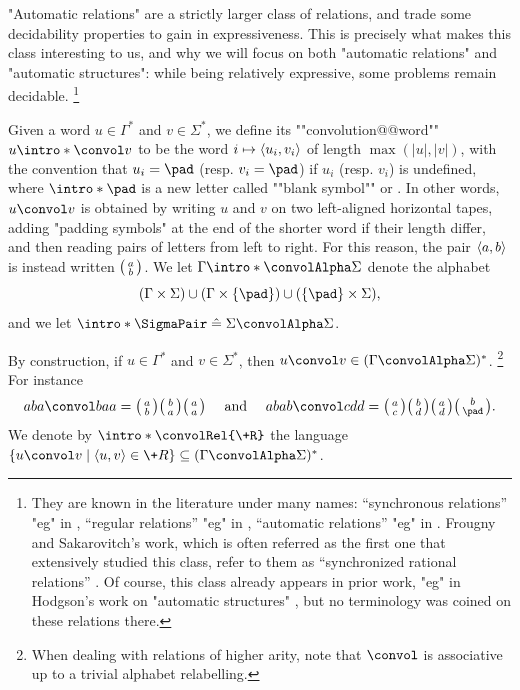 "Automatic relations" are a strictly larger class of relations,
and trade some decidability properties to gain in expressiveness.
This is precisely what makes this class interesting to us, and why we will focus
on both "automatic relations" and "automatic structures": while being relatively
expressive, some problems remain decidable.%
\footnote{They are known in the literature under many names:
``synchronous relations''
	"eg" in \cite[Definition~2.3]{CartonChoffrutGrigorieff2006DecisionProblems},
``regular relations''
	"eg" in \cite[Definition~2.2]{KhoussainovNerode1995AutomaticPresentations},
``automatic relations''
	"eg" in \cite[\S~2.1]{LodingSpinrath2019DecisionProblems}.
Frougny and Sakarovitch's work, which is often referred as the first one
that extensively studied this class, refer to them as ``synchronized rational relations''
\cite[\S~4]{FrougnySakarovitch1993SynchronizedRationalRelations}.
Of course, this class already appears in prior work, "eg" in Hodgson's work on
"automatic structures" \cite{Hodgson1983Decidabilite}, but no terminology was coined on these relations there.}

Given a word $u \in \Gamma^*$ and $v\in \Sigma^*$, we define
its \AP""convolution@@word"" $u \intro*\convol v$ to be the word
$i \mapsto \langle u_i, v_i\rangle$ of length $\max{(|u|,|v|)}$,
with the convention that $u_i = \pad$ (resp. $v_i = \pad$)
if $u_i$ (resp. $v_i$) is undefined, where $\intro*\pad$ is a new letter called
""blank symbol"" or . In other words,
$u \convol v$ is obtained by writing $u$ and $v$ on two left-aligned horizontal tapes,
adding "padding symbols" at the end of the shorter word if their length differ,
and then reading pairs of letters from left to right.
For this reason, the pair $\langle a,b\rangle$ is instead written $\pair{a}{b}$.
We let \AP$\Gamma \intro*\convolAlpha \Sigma$ denote the alphabet
\[(\Gamma \times \Sigma) \cup (\Gamma \times \{\pad\}) \cup (\{\pad\} \times \Sigma),\]
and we let $\intro*\SigmaPair \defeq \Sigma \convolAlpha \Sigma$.

By construction, if $u \in \Gamma^*$ and $v\in \Sigma^*$, then $u\convol v \in (\Gamma\convolAlpha\Sigma)^*$.%
\footnote{When dealing with relations of higher arity, note that $\convol$ is associative up to a trivial
alphabet relabelling.}
For instance
\[
	aba \convol baa = \pair{a}{b}\pair{b}{a}\pair{a}{a}
	\quad\text{ and }\quad
	abab \convol cdd = \pair{a}{c}\pair{b}{d}\pair{a}{d}\pair{b}{\pad}.
\]
We denote by \AP$\intro*\convolRel{\+R}$ the language
$\{ u \convol v \mid \tup{u,v} \in \+R\} \subseteq (\Gamma\convolAlpha\Sigma)^*$.


